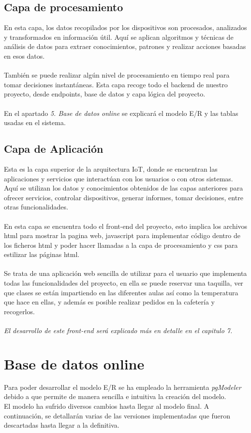\documentclass[12pt]{report}
\begin{document}
\section{Capa de procesamiento} %
En esta capa, los datos recopilados por los dispositivos son procesados, analizados y transformados en información útil. Aquí se aplican algoritmos y técnicas de análisis de datos para extraer conocimientos, patrones y realizar acciones basadas en esos datos. 
\\\\
También se puede realizar algún nivel de procesamiento en tiempo real para tomar decisiones instantáneas.
Esta capa recoge todo el backend de nuestro proyecto, desde endpoints, base de datos y capa lógica del proyecto.
\\\\
En el apartado \textit{5. Base de datos online} se explicará el modelo E/R y las tablas usadas en el sistema.
\section{Capa de Aplicación} %
Esta es la capa superior de la arquitectura IoT, donde se encuentran las aplicaciones y servicios que interactúan con los usuarios o con otros sistemas. Aquí se utilizan los datos y conocimientos obtenidos de las capas anteriores para ofrecer servicios, controlar dispositivos, generar informes, tomar decisiones, entre otras funcionalidades.
\\\\
En esta capa se encuentra todo el front-end del proyecto, esto implica los archivos html para mostrar la pagina web, javascript para implementar código dentro de los ficheros html y poder hacer llamadas a la capa de procesamiento y css para estilizar las páginas html. 
\\\\
Se trata de una aplicación web sencilla de utilizar para el usuario que implementa todas las funcionalidades del proyecto, en ella se puede reservar una taquilla, ver que clases se están impartiendo en las diferentes aulas así como la temperatura que hace en ellas, y además es posible realizar pedidos en la cafetería y recogerlos.
\\\\
\textit{El desarrollo de este front-end será explicado más en detalle en el capitulo 7.}

\chapter{Base de datos online} 
Para poder desarrollar el modelo E/R se ha empleado la herramienta \textit{pgModeler} debido a que permite de manera sencilla e intuitiva la creación del modelo.
\\
El modelo ha sufrido diversos cambios hasta llegar al modelo final. A continuación, se detallarán varias de las versiones implementadas que fueron descartadas hasta llegar a la definitiva.
\end{document}
